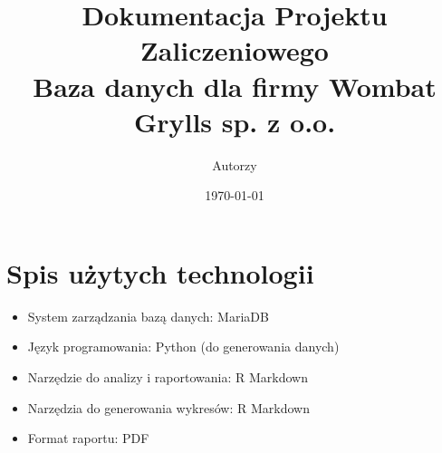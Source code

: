 \documentclass{article}
\title{Dokumentacja Projektu Zaliczeniowego\\ \huge Baza danych dla firmy Wombat Grylls sp. z o.o.}
\author{Autorzy}
\date{\today}
\begin{document}
\maketitle

\newpage

\tableofcontents
\newpage

\section{Spis użytych technologii}
\begin{itemize}
    \item System zarządzania bazą danych: MariaDB
    \item Język programowania: Python (do generowania danych)
    \item Narzędzie do analizy i raportowania: R Markdown
    \item Narzędzia do generowania wykresów: R Markdown
    \item Format raportu: PDF
\end{itemize}
\end{document}
